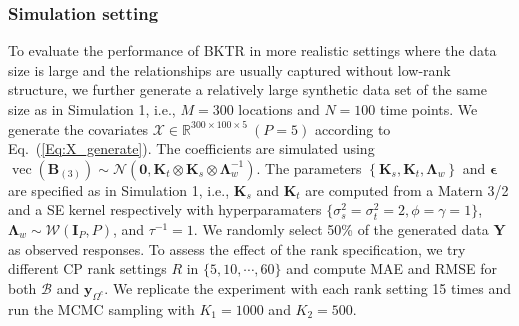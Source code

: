 \documentclass[12pt]{article}
\newcommand{\bd}[1]{\boldsymbol{#1}}
\begin{document}
\subsubsection{Simulation setting}
To evaluate the performance of BKTR in more realistic settings where the data size is large and the relationships are usually captured without low-rank structure, we further generate a relatively large synthetic data set of the same size as in Simulation 1, i.e., $M=300$ locations and $N=100$ time points. We generate the covariates $\boldsymbol{\mathcal{X}}\in\mathbb{R}^{300\times100\times5}~(P=5)$ according to Eq.~(\ref{Eq:X_generate}). The coefficients are simulated using $\operatorname{vec}\left(\boldsymbol{B}_{(3)}\right)\sim\mathcal{N}\left(\boldsymbol{0},\boldsymbol{K}_{t}\otimes\boldsymbol{K}_{s}\otimes\boldsymbol{\Lambda}_{w}^{-1}\right)$. The parameters $\left\{\boldsymbol{K}_{s},\boldsymbol{K}_{t},\boldsymbol{\Lambda}_{w}\right\}$ and $\boldsymbol{\epsilon}$ are specified as in Simulation 1, i.e., $\boldsymbol{K}_{s}$ and $\boldsymbol{K}_{t}$ are computed from a Matern 3/2 and a SE kernel respectively with hyperparamaters $\{\sigma_s^2=\sigma_t^2=2, \phi=\gamma=1\}$, $\boldsymbol{\Lambda}_{w}\sim\mathcal{W}(\boldsymbol{I}_{P},P)$, and $\tau^{-1}=1$. We randomly select 50\% of the generated data $\boldsymbol{Y}$ as observed responses. To assess the effect of the rank specification, we try different CP rank settings $R$ in $\{5,10,\cdots,60\}$ and compute MAE and RMSE for both $\boldsymbol{\mathcal{B}}$ and $\boldsymbol{y}_{\Omega^c}$. We replicate the experiment with each rank setting 15 times and run the MCMC sampling with $K_1=1000$ and $K_2=500$.





\end{document}
